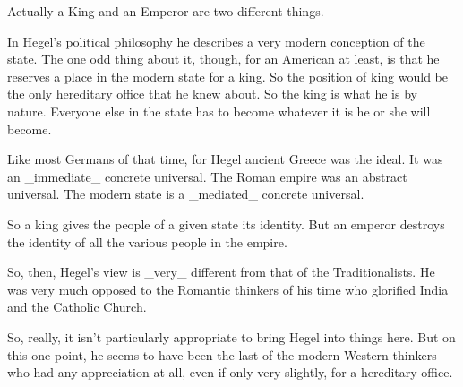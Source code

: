 \begin{footnotesize}
\begin{sffamily}
Actually a King and an Emperor are two different things.

In Hegel's political philosophy he describes a very modern conception of the state. The one odd thing about it, though, for an American at least, is that he reserves a place in the modern state for a king. So the position of king would be the only hereditary office that he knew about. So the king is what he is by nature. Everyone else in the state has to become whatever it is he or she will become.

Like most Germans of that time, for Hegel ancient Greece was the ideal. It was an \_immediate\_ concrete universal. The Roman empire was an abstract universal. The modern state is a \_mediated\_ concrete universal.

So a king gives the people of a given state its identity. But an emperor destroys the identity of all the various people in the empire.

So, then, Hegel's view is \_very\_ different from that of the Traditionalists. He was very much opposed to the Romantic thinkers of his time who glorified India and the Catholic Church.

So, really, it isn't particularly appropriate to bring Hegel into things here. But on this one point, he seems to have been the last of the modern Western thinkers who had any appreciation at all, even if only very slightly, for a hereditary office.

\hfill

\end{sffamily}
\end{footnotesize}

